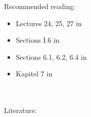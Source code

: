 \color{fontcolor}

\begin{frame}
	Recommended reading:
	\begin{itemize}
		\item Lectures 24, 25, 27 in \cite{TreBau}
		\item Sections I.6 in \cite{StrangData}
		\item Sections 6.1, 6.2, 6.4 in \cite{StrangLA_intro}	
		\item Kapitel 7 in \cite{Rannacher}
	\end{itemize}
	
	~\\~\\
	Literature:\\
	
\end{frame}
\begin{frame}
\end{frame}




